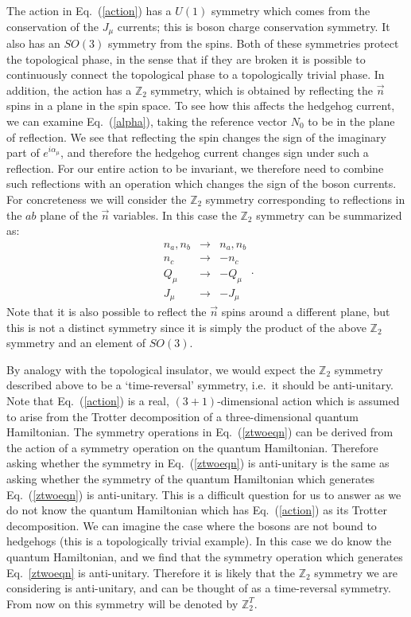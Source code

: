 \documentclass[prb,twocolumn]{revtex4-1}
\def\ztwo{\mathbb{Z}_2}
\def\ztwot{\mathbb{Z}_2^T}
\begin{document}
The action in Eq.~(\ref{action}) has a $U(1)$ symmetry which comes from the conservation of the $J_\mu$ currents; this is boson charge conservation symmetry. It also has an $SO(3)$ symmetry from the spins. Both of these symmetries protect the topological phase, in the sense that if they are broken it is possible to continuously connect the topological phase to a topologically trivial phase.
In addition, the action has a $\ztwo$ symmetry, which is obtained by reflecting the $\vec{n}$ spins in a plane in the spin space. To see how this affects the hedgehog current, we can examine Eq.~(\ref{alpha}), taking the reference vector $N_0$ to be in the plane of reflection. We see that reflecting the spin changes the sign of the imaginary part of $e^{i\alpha_\mu}$, and therefore the hedgehog current changes sign under such a reflection. For our entire action to be invariant, we therefore need to combine such reflections with an operation which changes the sign of the boson currents. For concreteness we will consider the $\ztwo$ symmetry corresponding to reflections in the $ab$ plane of the $\vec{n}$ variables. In this case the $\ztwo$ symmetry can be summarized as:
\begin{equation}
\begin{array}{ccc}
n_a,n_b & \rightarrow & n_a,n_b \\
n_c & \rightarrow & -n_c\\
Q_\mu & \rightarrow & -Q_\mu\\
J_\mu & \rightarrow & -J_\mu 
\end{array}.
\label{ztwoeqn}
\end{equation}
Note that it is also possible to reflect the $\vec n$ spins around a different plane, but this is not a distinct symmetry since it is simply the product of the above $\ztwo$ symmetry and an element of $SO(3)$. 

By analogy with the topological insulator, we would expect the $\ztwo$ symmetry described above to be a `time-reversal' symmetry, i.e.~it should be anti-unitary. Note that Eq.~(\ref{action}) is a real, $(3+1)$-dimensional action which is assumed to arise from the Trotter decomposition of a three-dimensional quantum Hamiltonian. The symmetry operations in Eq.~(\ref{ztwoeqn}) can be derived from the action of a symmetry operation on the quantum Hamiltonian. Therefore asking whether the symmetry in Eq.~(\ref{ztwoeqn}) is anti-unitary is the same as asking whether the symmetry of the quantum Hamiltonian which generates Eq.~(\ref{ztwoeqn}) is anti-unitary. This is a difficult question for us to answer as we do not know the quantum Hamiltonian which has Eq.~(\ref{action}) as its Trotter decomposition. We can imagine the case where the bosons are not bound to hedgehogs (this is a topologically trivial example). In this case we do know the quantum Hamiltonian, and we find that the symmetry operation which generates Eq.~\ref{ztwoeqn} is anti-unitary. Therefore it is likely that the $\ztwo$ symmetry we are considering is anti-unitary, and can be thought of as a time-reversal symmetry. From now on this symmetry will be denoted by $\ztwot$.
\end{document}
